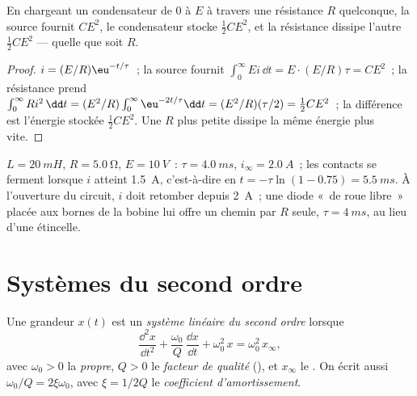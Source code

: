 \begin{proposition}\label{prop:b1:transient-regimes:rcenergy}
En chargeant un condensateur de $0$ à $E$ à travers une résistance $R$
quelconque, la source fournit $CE^2$, le condensateur stocke
$\tfrac12 CE^2$, et la résistance dissipe l'autre $\tfrac12 CE^2$ ---
quelle que soit $R$.
\end{proposition}

\begin{proof}
$i = (E/R)\eu^{-t/\tau}$~; la source fournit $\int_0^\infty Ei\,\dd t
= E \cdot (E/R)\tau = CE^2$~; la résistance prend $\int_0^\infty Ri^2\,\dd t
= (E^2/R)\int_0^\infty \eu^{-2t/\tau}\dd t = (E^2/R)(\tau/2) = \tfrac12 CE^2$~;
la différence est l'énergie stockée $\tfrac12 CE^2$. Une $R$ plus petite
dissipe la même énergie plus vite.
\end{proof}

\begin{example}\label{ex:b1:transient-regimes:relay}
$L = \qty{20}{mH}$, $R = \qty{5.0}{\ohm}$, $E = \qty{10}{V}$~: $\tau =
\qty{4.0}{ms}$, $i_\infty = \qty{2.0}{A}$~; les contacts se ferment
lorsque $i$ atteint \qty{1.5}{A}, c'est-à-dire en $t = -\tau\ln(1 - 0.75) =
\qty{5.5}{ms}$. À l'ouverture du circuit, $i$ doit retomber depuis
\qty{2}{A}~; une diode «~de roue libre~» placée aux bornes de la bobine
lui offre un chemin par $R$ seule, $\tau = \qty{4}{ms}$, au lieu d'une
étincelle.
\end{example}

\section{Systèmes du second ordre}

\begin{definition}\label{def:b1:transient-regimes:secondorder}
Une grandeur $x(t)$ est un \emph{système linéaire du second ordre} lorsque
\[
\frac{\dd^2 x}{\dd t^2} + \frac{\omega_0}{Q}\,\frac{\dd x}{\dd t} + \omega_0^2\,x
= \omega_0^2\,x_\infty ,
\]
avec $\omega_0 > 0$ la \emph{ propre}, $Q > 0$ le \emph{facteur
de qualité} (), et $x_\infty$ le . On
écrit aussi $\omega_0/Q = 2\xi\omega_0$, avec $\xi = 1/2Q$ le
\emph{coefficient d'amortissement}.
\end{definition}

